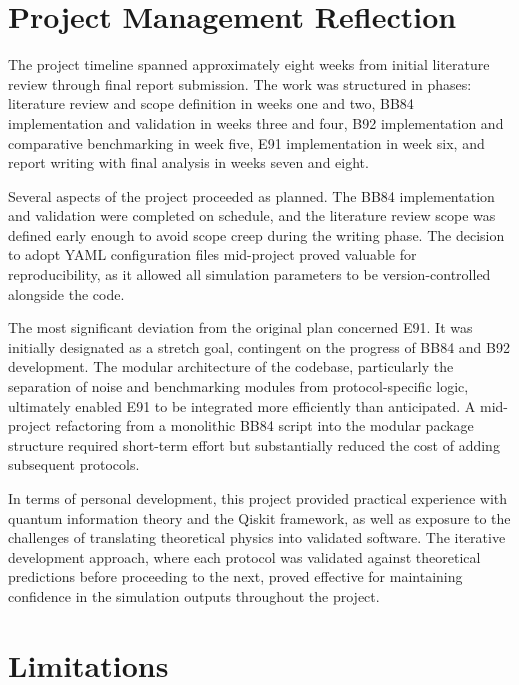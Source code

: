 \documentclass[10pt, a4paper]{report}
\begin{document}
\section{Project Management Reflection}

The project timeline spanned approximately eight weeks from initial literature review through final report submission. The work was structured in phases: literature review and scope definition in weeks one and two, BB84 implementation and validation in weeks three and four, B92 implementation and comparative benchmarking in week five, E91 implementation in week six, and report writing with final analysis in weeks seven and eight.

Several aspects of the project proceeded as planned. The BB84 implementation and validation were completed on schedule, and the literature review scope was defined early enough to avoid scope creep during the writing phase. The decision to adopt YAML configuration files mid-project proved valuable for reproducibility, as it allowed all simulation parameters to be version-controlled alongside the code.

The most significant deviation from the original plan concerned E91. It was initially designated as a stretch goal, contingent on the progress of BB84 and B92 development. The modular architecture of the codebase, particularly the separation of noise and benchmarking modules from protocol-specific logic, ultimately enabled E91 to be integrated more efficiently than anticipated. A mid-project refactoring from a monolithic BB84 script into the modular package structure required short-term effort but substantially reduced the cost of adding subsequent protocols.

In terms of personal development, this project provided practical experience with quantum information theory and the Qiskit framework, as well as exposure to the challenges of translating theoretical physics into validated software. The iterative development approach, where each protocol was validated against theoretical predictions before proceeding to the next, proved effective for maintaining confidence in the simulation outputs throughout the project.



\section{Limitations}
\end{document}
